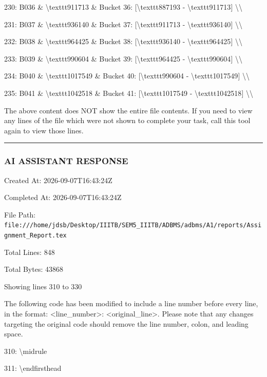 \documentclass[11pt,a4paper]{article}
\begin{document}
230: B036 \& \textbackslash{}texttt{911713} \& Bucket 36: [\textbackslash{}texttt{887193} - \textbackslash{}texttt{911713}] \textbackslash{}\textbackslash{}

231: B037 \& \textbackslash{}texttt{936140} \& Bucket 37: [\textbackslash{}texttt{911713} - \textbackslash{}texttt{936140}] \textbackslash{}\textbackslash{}

232: B038 \& \textbackslash{}texttt{964425} \& Bucket 38: [\textbackslash{}texttt{936140} - \textbackslash{}texttt{964425}] \textbackslash{}\textbackslash{}

233: B039 \& \textbackslash{}texttt{990604} \& Bucket 39: [\textbackslash{}texttt{964425} - \textbackslash{}texttt{990604}] \textbackslash{}\textbackslash{}

234: B040 \& \textbackslash{}texttt{1017549} \& Bucket 40: [\textbackslash{}texttt{990604} - \textbackslash{}texttt{1017549}] \textbackslash{}\textbackslash{}

235: B041 \& \textbackslash{}texttt{1042518} \& Bucket 41: [\textbackslash{}texttt{1017549} - \textbackslash{}texttt{1042518}] \textbackslash{}\textbackslash{}

The above content does NOT show the entire file contents. If you need to view any lines of the file which were not shown to complete your task, call this tool again to view those lines.


\hrule

\subsubsection{AI ASSISTANT RESPONSE}

Created At: 2026-09-07T16:43:24Z

Completed At: 2026-09-07T16:43:24Z

File Path: \texttt{file:///home/jdsb/Desktop/IIITB/SEM5\_IIITB/ADBMS/adbms/A1/reports/Assignment\_Report.tex}

Total Lines: 848

Total Bytes: 43868

Showing lines 310 to 330

The following code has been modified to include a line number before every line, in the format: <line\_number>: <original\_line>. Please note that any changes targeting the original code should remove the line number, colon, and leading space.

310: \textbackslash{}midrule

311: \textbackslash{}endfirsthead
\end{document}
